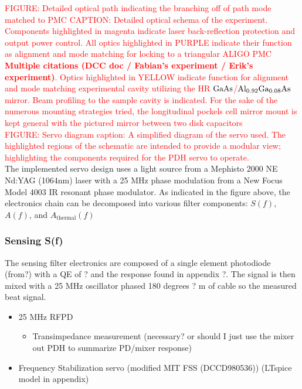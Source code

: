 \textcolor{red}{FIGURE: Detailed optical path indicating the branching off of path mode matched to PMC}
\textcolor{red}{CAPTION: Detailed optical schema of the experiment. Components highlighted in magenta indicate laser back-reflection protection and output power control. All optics highlighted in PURPLE indicate their function as alignment and mode matching for locking to a triangular ALIGO PMC \textbf{Multiple citations (DCC doc / Fabian's experiment / Erik's experiment)}. Optics highlighted in YELLOW indicate function for alignment and mode matching experimental cavity utilizing the HR $\mathrm{GaAs}$/$\mathrm{Al_{0.92}Ga_{0.08}As}$ mirror. Beam profiling to the sample cavity is indicated. For the sake of the numerous mounting strategies tried, the longitudinal pockels cell mirror mount is kept general with the pictured mirror between two disk capacitors}
\\
\textcolor{red}{FIGURE: Servo diagram}
\textcolor{red}{caption: A simplified diagram of the servo used. The highlighted regions of the schematic are intended to provide a modular view; highlighting the components required for the PDH servo to operate.}
\\
The implemented servo design uses a light source from a Mephisto 2000 NE Nd:YAG (1064nm) laser with a 25 MHz phase modulation from a New Focus Model 4003 IR resonant phase modulator. As indicated in the figure above, the electronics chain can be decomposed into various filter components: $S(f)$, $A(f)$, and $A_\mathrm{thermal}(f)$

\subsubsection{Sensing S(f)}
The sensing filter electronics are composed of a single element photodiode (from?) with a QE of ? and the response found in appendix ?. The signal is then mixed with a 25 MHz oscillator phased 180 degrees ? m of cable so the measured beat signal.
\begin{itemize}
\item 25 MHz RFPD
\begin{itemize}
\item Transimpedance measurement (necessary? or should I just use the mixer out PDH to summarize PD/mixer response)
\end{itemize}
\item Frequency Stabilization servo (modified MIT FSS (DCCD980536)) (LTspice model in appendix)
\end{itemize}


